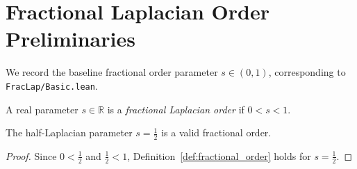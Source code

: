 \chapter{Fractional Laplacian Order Preliminaries}

We record the baseline fractional order parameter $s \in (0, 1)$, corresponding to \texttt{FracLap/Basic.lean}.

\begin{definition}\label{def:fractional_order}
\leanok
A real parameter $s \in \mathbb{R}$ is a \emph{fractional Laplacian order} if $0 < s < 1$.
\end{definition}

\begin{theorem}\label{thm:fractional_order_half}
\leanok
The half-Laplacian parameter $s = \frac{1}{2}$ is a valid fractional order.
\end{theorem}

\begin{proof}
\leanok
Since $0 < \frac{1}{2}$ and $\frac{1}{2} < 1$, Definition~\ref{def:fractional_order} holds for $s = \frac{1}{2}$.
\end{proof}
